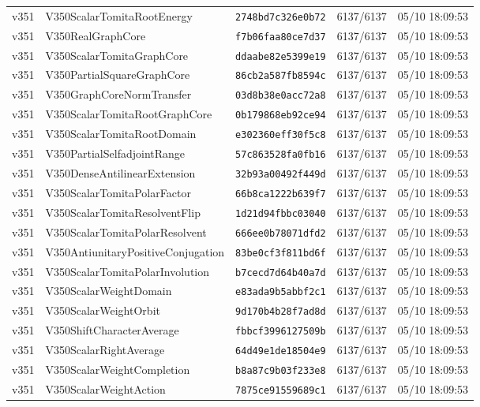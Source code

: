\documentclass[11pt]{article}
\theoremstyle{definition}\newtheorem{deriv}{Derivation}
\begin{document}
{\begin{longtable}{@{}lllll@{}}
v351 & V350ScalarTomitaRootEnergy & \texttt{2748bd7c326e0b72} & 6137/6137 & 05/10 18:09:53 \\
v351 & V350RealGraphCore & \texttt{f7b06faa80ce7d37} & 6137/6137 & 05/10 18:09:53 \\
v351 & V350ScalarTomitaGraphCore & \texttt{ddaabe82e5399e19} & 6137/6137 & 05/10 18:09:53 \\
v351 & V350PartialSquareGraphCore & \texttt{86cb2a587fb8594c} & 6137/6137 & 05/10 18:09:53 \\
v351 & V350GraphCoreNormTransfer & \texttt{03d8b38e0acc72a8} & 6137/6137 & 05/10 18:09:53 \\
v351 & V350ScalarTomitaRootGraphCore & \texttt{0b179868eb92ce94} & 6137/6137 & 05/10 18:09:53 \\
v351 & V350ScalarTomitaRootDomain & \texttt{e302360eff30f5c8} & 6137/6137 & 05/10 18:09:53 \\
v351 & V350PartialSelfadjointRange & \texttt{57c863528fa0fb16} & 6137/6137 & 05/10 18:09:53 \\
v351 & V350DenseAntilinearExtension & \texttt{32b93a00492f449d} & 6137/6137 & 05/10 18:09:53 \\
v351 & V350ScalarTomitaPolarFactor & \texttt{66b8ca1222b639f7} & 6137/6137 & 05/10 18:09:53 \\
v351 & V350ScalarTomitaResolventFlip & \texttt{1d21d94fbbc03040} & 6137/6137 & 05/10 18:09:53 \\
v351 & V350ScalarTomitaPolarResolvent & \texttt{666ee0b78071dfd2} & 6137/6137 & 05/10 18:09:53 \\
v351 & V350AntiunitaryPositiveConjugation & \texttt{83be0cf3f811bd6f} & 6137/6137 & 05/10 18:09:53 \\
v351 & V350ScalarTomitaPolarInvolution & \texttt{b7cecd7d64b40a7d} & 6137/6137 & 05/10 18:09:53 \\
v351 & V350ScalarWeightDomain & \texttt{e83ada9b5abbf2c1} & 6137/6137 & 05/10 18:09:53 \\
v351 & V350ScalarWeightOrbit & \texttt{9d170b4b28f7ad8d} & 6137/6137 & 05/10 18:09:53 \\
v351 & V350ShiftCharacterAverage & \texttt{fbbcf3996127509b} & 6137/6137 & 05/10 18:09:53 \\
v351 & V350ScalarRightAverage & \texttt{64d49e1de18504e9} & 6137/6137 & 05/10 18:09:53 \\
v351 & V350ScalarWeightCompletion & \texttt{b8a87c9b03f233e8} & 6137/6137 & 05/10 18:09:53 \\
v351 & V350ScalarWeightAction & \texttt{7875ce91559689c1} & 6137/6137 & 05/10 18:09:53 \\

\end{longtable}}
\end{document}
